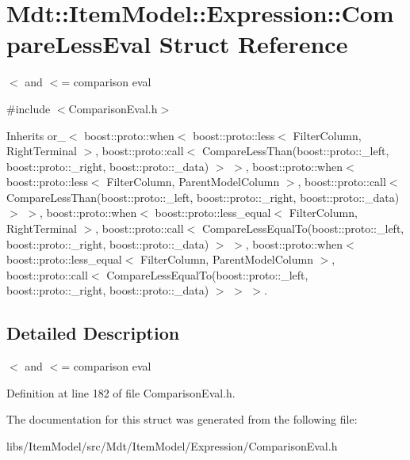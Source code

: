 \hypertarget{struct_mdt_1_1_item_model_1_1_expression_1_1_compare_less_eval}{}\section{Mdt\+:\+:Item\+Model\+:\+:Expression\+:\+:Compare\+Less\+Eval Struct Reference}
\label{struct_mdt_1_1_item_model_1_1_expression_1_1_compare_less_eval}


$<$ and $<$= comparison eval  




{\ttfamily \#include $<$Comparison\+Eval.\+h$>$}



Inherits or\+\_\+$<$ boost\+::proto\+::when$<$ boost\+::proto\+::less$<$ Filter\+Column, Right\+Terminal $>$, boost\+::proto\+::call$<$ Compare\+Less\+Than(boost\+::proto\+::\+\_\+left, boost\+::proto\+::\+\_\+right, boost\+::proto\+::\+\_\+data) $>$ $>$, boost\+::proto\+::when$<$ boost\+::proto\+::less$<$ Filter\+Column, Parent\+Model\+Column $>$, boost\+::proto\+::call$<$ Compare\+Less\+Than(boost\+::proto\+::\+\_\+left, boost\+::proto\+::\+\_\+right, boost\+::proto\+::\+\_\+data) $>$ $>$, boost\+::proto\+::when$<$ boost\+::proto\+::less\+\_\+equal$<$ Filter\+Column, Right\+Terminal $>$, boost\+::proto\+::call$<$ Compare\+Less\+Equal\+To(boost\+::proto\+::\+\_\+left, boost\+::proto\+::\+\_\+right, boost\+::proto\+::\+\_\+data) $>$ $>$, boost\+::proto\+::when$<$ boost\+::proto\+::less\+\_\+equal$<$ Filter\+Column, Parent\+Model\+Column $>$, boost\+::proto\+::call$<$ Compare\+Less\+Equal\+To(boost\+::proto\+::\+\_\+left, boost\+::proto\+::\+\_\+right, boost\+::proto\+::\+\_\+data) $>$ $>$ $>$.



\subsection{Detailed Description}
$<$ and $<$= comparison eval 

Definition at line 182 of file Comparison\+Eval.\+h.



The documentation for this struct was generated from the following file\+:\begin{DoxyCompactItemize}
\item 
libs/\+Item\+Model/src/\+Mdt/\+Item\+Model/\+Expression/Comparison\+Eval.\+h\end{DoxyCompactItemize}
